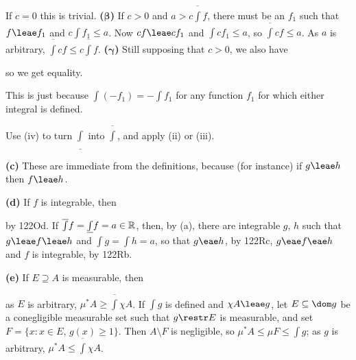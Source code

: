 {\medskip 
      
 If $c=0$ this is trivial.   {\bf 
($\pmb{\beta}$)} If $c>0$ and $a>c\overline{\int}f$, there must be an 
$f_1$ such that $f\leae f_1$ and $c\int f_1\le a$.   Now 
$cf\leae cf_1$ and $\int cf_1\le a$, so $\overline{\int}cf\le a$. 
As $a$ is arbitrary, $\overline{\int}cf\le c\overline{\int}f$. 
{\bf($\pmb{\gamma}$)}  Still supposing that $c>0$, we also have 
      
      
\noindent so we get equality. 
      
\medskip 
      
 This is just because $\int(-f_1)=-\int f_1$ for any 
function $f_1$ for which either integral is defined. 
      
\medskip 
      
 Use (iv) to turn $\underline{\int}$ into 
$\overline{\int}$, and apply (ii) or (iii). 
      
\medskip 
      
{\bf (c)} These are immediate from the definitions, because (for 
instance) if $g\leae h$ then $f\leae h$. 
      
\medskip 
      
{\bf (d)} If $f$ is integrable, then 
      
      
\noindent by 122Od.   If 
$\overline{\int}f=\underline{\int}f=a\in\Bbb R$, then, by (a), there are  
integrable $g$, $h$ such that $g\leae f\leae h$ 
and $\int g=\int h=a$, so that $g\eae h$, by 122Rc, $g\eae f\eae h$  
and $f$ is integrable, by 122Rb. 
 
\medskip 
 
{\bf (e)} If $E\supseteq A$ is measurable, then  
 
 
\noindent as $E$ is arbitrary, $\mu^*A\ge\overline{\int}\chi A$.    
If $\int g$ is defined and $\chi A\leae g$, let $E\subseteq\dom g$ be a  
conegligible measurable set such that $g\restr E$ is measurable, and set  
$F=\{x:x\in E$, $g(x)\ge 1\}$.   Then $A\setminus F$ is negligible, so  
$\mu^*A\le\mu F\le\int g$;  as $g$ is arbitrary,  
$\mu^*A\le\overline{\int}\chi A$. 
}%
      
      
